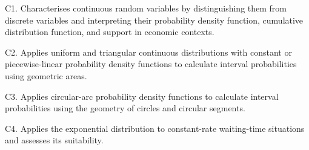 \makeatletter
{}
\makeatother


\graphicspath{{./}{../}{../../}{../../../}{../../../../}{preamble/}{../preamble/}{../../preamble/}{../../../preamble/}{../../../../preamble/}}




\AtBeginDocument{%
	\fontsize{12.2pt}{13.84pt}\selectfont
}


	
	
	\vspace{0.1cm}
	\StudentInfo
	
	{
		C1. Characterises continuous random variables by distinguishing them
		from discrete variables and interpreting their probability density
		function, cumulative distribution function, and support in economic
		contexts.\par
		C2. Applies uniform and triangular continuous distributions with
		constant or piecewise-linear probability density functions to
		calculate interval probabilities using geometric areas.\par
		C3. Applies circular-arc probability density functions to calculate
		interval probabilities using the geometry of circles and circular
		segments.\par
		C4. Applies the exponential distribution to constant-rate waiting-time
		situations and assesses its suitability.
	}
	
